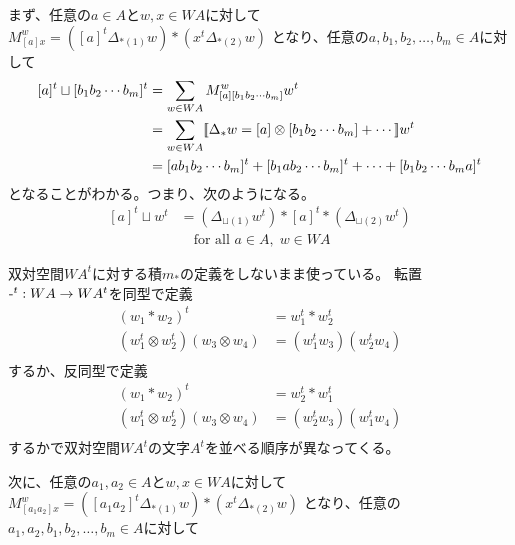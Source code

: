 	まず、任意の$a\in A$と$w,x\in WA$に対して
	$M_{[a]x}^w=([a]^t\Delta_{*(1)}w)*(x^t\Delta_{*(2)}w)$
	となり、任意の$a,b_1,b_2,\dots,b_m\in A$に対して
	\begin{equation*}\begin{split} %
		[a]^t\sqcup [b_1b_2\cdots b_m]^t
		&= \sum_{w\in WA}M_{[a][b_1b_2\cdots b_m]}^ww^t \\
		&= \sum_{w\in WA}\jump{\Delta_*w=[a]\otimes [b_1b_2\cdots b_m]+\cdots}w^t \\
		&= [ab_1b_2\cdots b_m]^t + [b_1ab_2\cdots b_m]^t
			+ \cdots + [b_1b_2\cdots b_ma]^t \\
	\end{split}\end{equation*} %
	となることがわかる。つまり、次のようになる。
	\begin{equation*}\begin{split} %
		[a]^t\sqcup w^t 
		&= (\Delta_{\sqcup(1)}w^t)*[a]^t*(\Delta_{\sqcup(2)}w^t) \\
		&\quad\text{for all }a\in A,\;w\in WA
	\end{split}\end{equation*} %
	\begin{todo}[双対空間に対する積$m_*$]\label{todo:双対空間に対する積} %
		双対空間$WA^t$に対する積$m_*$の定義をしないまま使っている。
		転置${\mathchar`-}^t:WA\to WA^t$を同型で定義
		\begin{equation*}\begin{split} %
			(w_1*w_2)^t &= w_1^t * w_2^t \\
			(w_1^t\otimes w_2^t)(w_3\otimes w_4) &= (w_1^tw_3)(w_2^tw_4) \\
		\end{split}\end{equation*} %
		するか、反同型で定義
		\begin{equation*}\begin{split} %
			(w_1*w_2)^t &= w_2^t * w_1^t \\
			(w_1^t\otimes w_2^t)(w_3\otimes w_4) &= (w_2^tw_3)(w_1^tw_4) \\
		\end{split}\end{equation*} %
		するかで双対空間$WA^t$の文字$A^t$を並べる順序が異なってくる。
	\end{todo} %
	次に、任意の$a_1,a_2\in A$と$w,x\in WA$に対して
	$M_{[a_1a_2]x}^w=([a_1a_2]^t\Delta_{*(1)}w)*(x^t\Delta_{*(2)}w)$
	となり、任意の$a_1,a_2,b_1,b_2,\dots,b_m\in A$に対して
